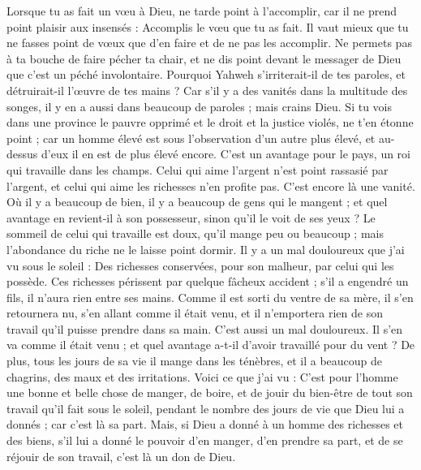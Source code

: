 \begin{multicols}{2}
Lorsque tu as fait un vœu à Dieu, ne tarde point à l'accomplir, car il ne prend point plaisir aux insensés : Accomplis le vœu que tu as fait.
Il vaut mieux que tu ne fasses point de vœux que d'en faire et de ne pas les accomplir.
Ne permets pas à ta bouche de faire pécher ta chair, et ne dis point devant le messager de Dieu que c'est un péché involontaire. Pourquoi Yahweh s'irriterait-il de tes paroles, et détruirait-il l'œuvre de tes mains ?
Car s'il y a des vanités dans la multitude des songes, il y en a aussi dans beaucoup de paroles ; mais crains Dieu.
Si tu vois dans une province le pauvre opprimé et le droit et la justice violés, ne t'en étonne point ; car un homme élevé est sous l'observation d'un autre plus élevé, et au-dessus d'eux il en est de plus élevé encore.
C'est un avantage pour le pays, un roi qui travaille dans les champs.
Celui qui aime l'argent n'est point rassasié par l'argent, et celui qui aime les richesses n'en profite pas. C'est encore là une vanité.
Où il y a beaucoup de bien, il y a beaucoup de gens qui le mangent ; et quel avantage en revient-il à son possesseur, sinon qu'il le voit de ses yeux ?
Le sommeil de celui qui travaille est doux, qu'il mange peu ou beaucoup ; mais l'abondance du riche ne le laisse point dormir.
Il y a un mal douloureux que j'ai vu sous le soleil : Des richesses conservées, pour son malheur, par celui qui les possède.
Ces richesses périssent par quelque fâcheux accident ; s'il a engendré un fils, il n'aura rien entre ses mains.
Comme il est sorti du ventre de sa mère, il s'en retournera nu, s'en allant comme il était venu, et il n'emportera rien de son travail qu'il puisse prendre dans sa main.
C'est aussi un mal douloureux. Il s'en va comme il était venu ; et quel avantage a-t-il d'avoir travaillé pour du vent ?
De plus, tous les jours de sa vie il mange dans les ténèbres, et il a beaucoup de chagrins, des maux et des irritations.
Voici ce que j'ai vu : C'est pour l'homme une bonne et belle chose de manger, de boire, et de jouir du bien-être de tout son travail qu'il fait sous le soleil, pendant le nombre des jours de vie que Dieu lui a donnés ; car c'est là sa part.
Mais, si Dieu a donné à un homme des richesses et des biens, s'il lui a donné le pouvoir d'en manger, d'en prendre sa part, et de se réjouir de son travail, c'est là un don de Dieu.

\end{multicols}
